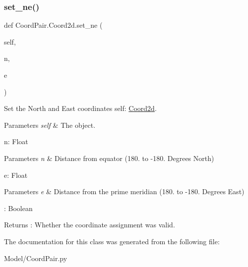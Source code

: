 \subsubsection{\texorpdfstring{set\+\_\+ne()}{set\_ne()}}
{\footnotesize\ttfamily def Coord\+Pair.\+Coord2d.\+set\+\_\+ne (\begin{DoxyParamCaption}\item[{}]{self,  }\item[{}]{n,  }\item[{}]{e }\end{DoxyParamCaption})}



Set the North and East coordinates  self\+: \hyperlink{classCoordPair_1_1Coord2d}{Coord2d}. 


\begin{DoxyParams}{Parameters}
{\em self} & The object.\\
\hline
\end{DoxyParams}
n\+: Float 
\begin{DoxyParams}{Parameters}
{\em n} & Distance from equator (180. to -\/180. Degrees North)\\
\hline
\end{DoxyParams}
e\+: Float 
\begin{DoxyParams}{Parameters}
{\em e} & Distance from the prime meridian (180. to -\/180. Degrees East)\\
\hline
\end{DoxyParams}
\+: Boolean \begin{DoxyReturn}{Returns}
\+: Whether the coordinate assignment was valid. 
\end{DoxyReturn}


The documentation for this class was generated from the following file\+:\begin{DoxyCompactItemize}
\item 
Model/Coord\+Pair.\+py\end{DoxyCompactItemize}
